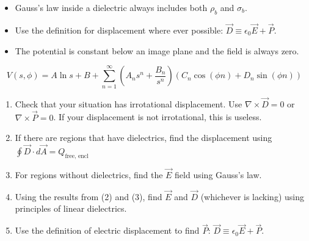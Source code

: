 \documentclass{article}
\newcommand{\formula}[2]{\begin{center} \begin{tcolorbox}[title = #1, boxrule=2pt,arc=3.4pt,boxsep=0mm] $$#2$$\end{tcolorbox}\end{center}}
\newcommand{\formbox}[2]{\begin{center} \begin{tcolorbox}[title = #1, boxrule=2pt,arc=3.4pt,boxsep=0mm] #2\end{tcolorbox}\end{center}}
\begin{document}
\begin{multicols}{2}
        \formbox{Takeaways from Practice}{
            \begin{itemize}
                \item Gauss's law inside a dielectric always includes both $\rho_b$ and $\sigma_b$.
                \item Use the definition for displacement where ever possible: $\vec{D} \equiv \epsilon_0 \vec{E} + \vec{P}$.
                \item The potential is constant below an image plane and the field is always zero. 
            \end{itemize}
        }
        \formula{Cylindrical Laplacian Solution}{
            V(s, \phi) = A \ln s + B + \sum_{n = 1}^\infty \left(A_n s^n + \frac{B_n}{s^n}\right) \left(C_n \cos (\phi n) + D_n \sin(\phi n)\right)
        }
        \formbox{General Problem Solving Strategy for Dielectrics}{
            \begin{enumerate}
                \item Check that your situation has irrotational displacement. Use $\nabla \times \vec{D} = 0$ or
                $\nabla \times \vec{P} = 0$. If your displacement is not irrotational, this is useless.
                \item If there are regions that have dielectrics, find the displacement using $\oint \vec{D} \cdot d\vec{A} = Q_\textrm{free, encl}$
                \item For regions without dielectrics, find the $\vec{E}$ field using Gauss's law.
                \item Using the results from (2) and (3), find $\vec{E}$ and $\vec{D}$ (whichever is lacking) 
                using principles of linear dielectrics.
                \item Use the definition of electric displacement to find $\vec{P}$: $\vec{D} \equiv \epsilon_0 \vec{E} + \vec{P}$.
            \end{enumerate}
        }
        \vfill\null
    \end{multicols}
\end{document}
